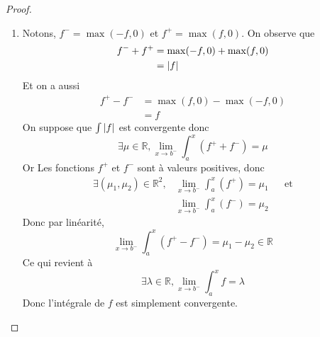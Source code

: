 \documentclass[11pt,colorlinks]{book}
\theoremstyle{mytheoremstyle}
\theoremstyle{mytheoremstyle}
\theoremstyle{mytheoremstyle}
\theoremstyle{mytheoremstyle}
\theoremstyle{mytheoremstyle}
\theoremstyle{mytheoremstyle}
\theoremstyle{mytheoremstyle}
\theoremstyle{mytheoremstyle}
\theoremstyle{myproblemstyle}
\def\mbb#1{\mathbb{#1}}
\def\bR{\mbb{R}}
\begin{document}
\begin{theorem}[Comparaison]
\begin{proof}
      \begin{enumerate}
        \item Notons, $f^{-} = \max(-f,0)$ et $f^{+} = \max(f,0)$. On observe que 
      \begin{align*}
        f^{-} + f^{+} &= \max(-f,0) + \max(f,0) \\ 
                      &= \abs{f}
      \end{align*}
      Et on a aussi
      \begin{align*}
        f^{+} - f^{-} &= \max(f,0) - \max(-f,0) \\ 
                     &= f
      \end{align*}
      On suppose que $\int \abs{f}$ est convergente donc 
      \begin{equation*}
        \exists \mu \in \bR, \lim_{x \to b^{-}} \int_a^x (f^{+}+f^{-}) = \mu
      \end{equation*}
      Or Les fonctions $f^{+}$ et $f^{-}$ sont à valeurs positives, donc
      \begin{align*}
        \exists (\mu_1,\mu_2) \in \bR^2, &\lim_{x \to b^{-}} \int_a^x (f^{+}) = \mu_1 && \text{et} \\ 
                                         &\lim_{x \to b^{-}} \int_a^x (f^{-}) = \mu_2
      \end{align*}
      Donc par linéarité, 
      \begin{equation*}
        \lim_{x \to b^{-}} \int_a^x (f^{+}-f^{-}) = \mu_1 - \mu_2 \in \bR
      \end{equation*}
      Ce qui revient à 
      \begin{equation*}
        \exists \lambda \in \bR, \lim_{x \to b^{-}} \int_a^x f = \lambda
      \end{equation*}
      Donc l'intégrale de $f$ est simplement convergente.\newline


\end{enumerate}
\end{proof}
\end{theorem}
\end{document}
